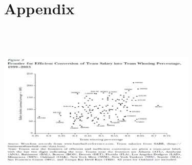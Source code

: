 \documentclass[dvipdfmx,12pt]{beamer}
\begin{document}
\section{Appendix}
\begin{frame}

\begin{center}

\includegraphics[width=9.5cm,height=8.4cm]{Hakes_Sauer_F2.pdf}

\end{center}

\end{frame}
\end{document}

